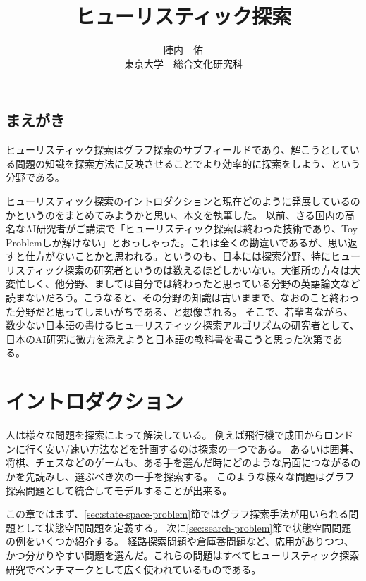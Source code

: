 \documentclass{report}
\title{ヒューリスティック探索}
\author{陣内　佑 \\
東京大学　総合文化研究科}
\begin{document}
\maketitle

\tableofcontents
\newpage

\section*{まえがき}
ヒューリスティック探索はグラフ探索のサブフィールドであり、解こうとしている問題の知識を探索方法に反映させることでより効率的に探索をしよう、という分野である。

ヒューリスティック探索のイントロダクションと現在どのように発展しているのかというのをまとめてみようかと思い、本文を執筆した。
以前、さる国内の高名なAI研究者がご講演で「ヒューリスティック探索は終わった技術であり、Toy Problemしか解けない」とおっしゃった。これは全くの勘違いであるが、思い返すと仕方がないことかと思われる。というのも、日本には探索分野、特にヒューリスティック探索の研究者というのは数えるほどしかいない。大御所の方々は大変忙しく、他分野、ましては自分では終わったと思っている分野の英語論文など読まないだろう。こうなると、その分野の知識は古いままで、なおのこと終わった分野だと思ってしまいがちである、と想像される。
そこで、若輩者ながら、数少ない日本語の書けるヒューリスティック探索アルゴリズムの研究者として、日本のAI研究に微力を添えようと日本語の教科書を書こうと思った次第である。


\chapter{イントロダクション}
\label{ch:introduction}

人は様々な問題を探索によって解決している。
例えば飛行機で成田からロンドンに行く安い/速い方法などを計画するのは探索の一つである。
あるいは囲碁、将棋、チェスなどのゲームも、ある手を選んだ時にどのような局面につながるのかを先読みし、選ぶべき次の一手を探索する。
このような様々な問題はグラフ探索問題として統合してモデルすることが出来る。


この章ではまず、\ref{sec:state-space-problem}節ではグラフ探索手法が用いられる問題として状態空間問題を定義する。
次に\ref{sec:search-problem}節で状態空間問題の例をいくつか紹介する。
経路探索問題や倉庫番問題など、応用がありつつ、かつ分かりやすい問題を選んだ。これらの問題はすべてヒューリスティック探索研究でベンチマークとして広く使われているものである。
\end{document}
